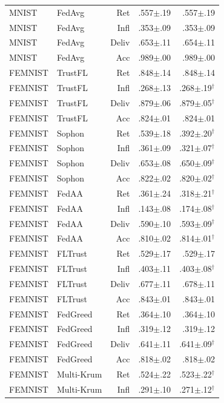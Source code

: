 \begin{tabular}{llrrr}
MNIST & FedAvg & Ret & .557$\pm$.19 & .557$\pm$.19 \\
MNIST & FedAvg & Infl & .353$\pm$.09 & .353$\pm$.09 \\
MNIST & FedAvg & Deliv & .653$\pm$.11 & .654$\pm$.11 \\
MNIST & FedAvg & Acc & .989$\pm$.00 & .989$\pm$.00 \\
FEMNIST & TrustFL & Ret & .848$\pm$.14 & .848$\pm$.14 \\
FEMNIST & TrustFL & Infl & .268$\pm$.13 & .268$\pm$.19$^{\dagger}$ \\
FEMNIST & TrustFL & Deliv & .879$\pm$.06 & .879$\pm$.05$^{\dagger}$ \\
FEMNIST & TrustFL & Acc & .824$\pm$.01 & .824$\pm$.01 \\
FEMNIST & Sophon & Ret & .539$\pm$.18 & .392$\pm$.20$^{\dagger}$ \\
FEMNIST & Sophon & Infl & .361$\pm$.09 & .321$\pm$.07$^{\dagger}$ \\
FEMNIST & Sophon & Deliv & .653$\pm$.08 & .650$\pm$.09$^{\dagger}$ \\
FEMNIST & Sophon & Acc & .822$\pm$.02 & .820$\pm$.02$^{\dagger}$ \\
FEMNIST & FedAA & Ret & .361$\pm$.24 & .318$\pm$.21$^{\dagger}$ \\
FEMNIST & FedAA & Infl & .143$\pm$.08 & .174$\pm$.08$^{\dagger}$ \\
FEMNIST & FedAA & Deliv & .590$\pm$.10 & .593$\pm$.09$^{\dagger}$ \\
FEMNIST & FedAA & Acc & .810$\pm$.02 & .814$\pm$.01$^{\dagger}$ \\
FEMNIST & FLTrust & Ret & .529$\pm$.17 & .529$\pm$.17 \\
FEMNIST & FLTrust & Infl & .403$\pm$.11 & .403$\pm$.08$^{\dagger}$ \\
FEMNIST & FLTrust & Deliv & .677$\pm$.11 & .678$\pm$.11 \\
FEMNIST & FLTrust & Acc & .843$\pm$.01 & .843$\pm$.01 \\
FEMNIST & FedGreed & Ret & .364$\pm$.10 & .364$\pm$.10 \\
FEMNIST & FedGreed & Infl & .319$\pm$.12 & .319$\pm$.12 \\
FEMNIST & FedGreed & Deliv & .641$\pm$.11 & .641$\pm$.09$^{\dagger}$ \\
FEMNIST & FedGreed & Acc & .818$\pm$.02 & .818$\pm$.02 \\
FEMNIST & Multi-Krum & Ret & .524$\pm$.22 & .523$\pm$.22$^{\dagger}$ \\
FEMNIST & Multi-Krum & Infl & .291$\pm$.10 & .271$\pm$.12$^{\dagger}$ \\

\end{tabular}
